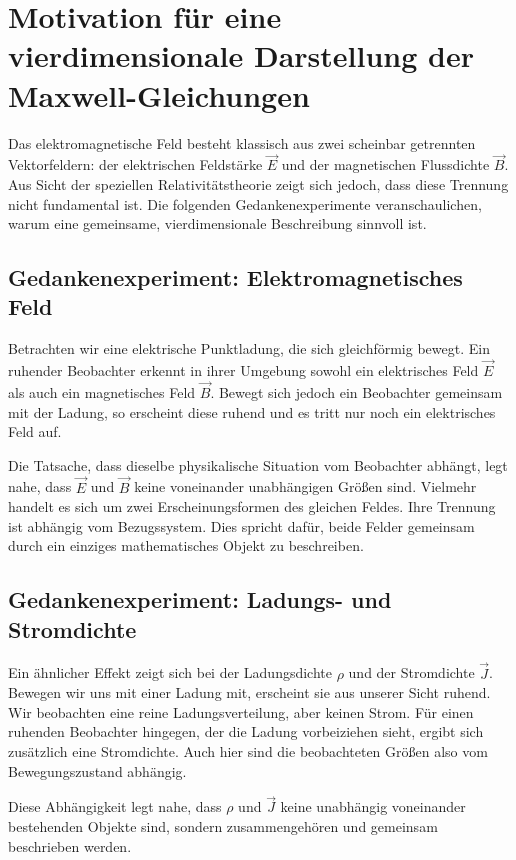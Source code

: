 \section{Motivation für eine vierdimensionale Darstellung der Maxwell-Gleichungen}

Das elektromagnetische Feld besteht klassisch aus zwei scheinbar getrennten Vektorfeldern: der elektrischen Feldstärke \( \vec{E} \) und der magnetischen Flussdichte \( \vec{B} \). Aus Sicht der speziellen Relativitätstheorie zeigt sich jedoch, dass diese Trennung nicht fundamental ist. Die folgenden Gedankenexperimente veranschaulichen, warum eine gemeinsame, vierdimensionale Beschreibung sinnvoll ist.

\subsection{Gedankenexperiment: Elektromagnetisches Feld}

Betrachten wir eine elektrische Punktladung, die sich gleichförmig bewegt.
Ein ruhender Beobachter erkennt in ihrer Umgebung sowohl ein elektrisches Feld \( \vec{E} \) als auch ein magnetisches Feld \( \vec{B} \).
Bewegt sich jedoch ein Beobachter gemeinsam mit der Ladung, so erscheint diese ruhend und es tritt nur noch ein elektrisches Feld auf. 

Die Tatsache, dass dieselbe physikalische Situation vom Beobachter abhängt, legt nahe, dass \( \vec{E} \) und \( \vec{B} \) keine voneinander unabhängigen Größen sind.
Vielmehr handelt es sich um zwei Erscheinungsformen des gleichen Feldes.
Ihre Trennung ist abhängig vom Bezugssystem.
Dies spricht dafür, beide Felder gemeinsam durch ein einziges mathematisches Objekt zu beschreiben.

\subsection{Gedankenexperiment: Ladungs- und Stromdichte}

Ein ähnlicher Effekt zeigt sich bei der Ladungsdichte \( \rho \) und der Stromdichte \( \vec{J} \).
Bewegen wir uns mit einer Ladung mit, erscheint sie aus unserer Sicht ruhend.
Wir beobachten eine reine Ladungsverteilung, aber keinen Strom.
Für einen ruhenden Beobachter hingegen, der die Ladung vorbeiziehen sieht, ergibt sich zusätzlich eine Stromdichte.
Auch hier sind die beobachteten Größen also vom Bewegungszustand abhängig.

Diese Abhängigkeit legt nahe, dass \( \rho \) und \( \vec{J} \) keine unabhängig voneinander bestehenden Objekte sind, sondern zusammengehören und gemeinsam beschrieben werden.

